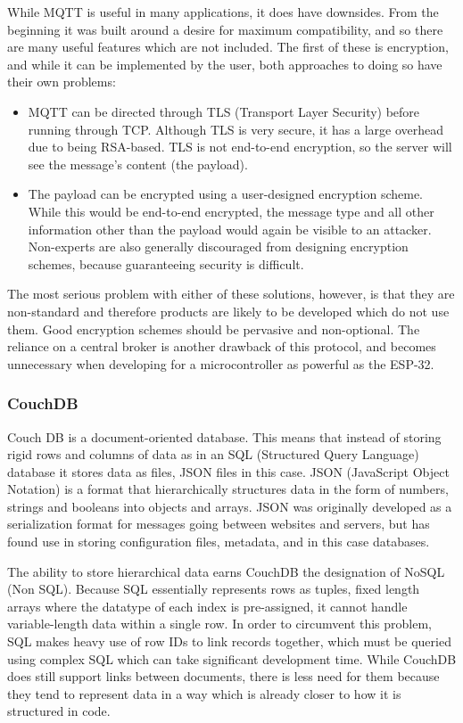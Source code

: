 \documentclass{article}
\begin{document}
While MQTT is useful in many applications, it does have downsides. From the beginning it was built around a desire for maximum compatibility, and so there are many useful features which are not included. The first of these is encryption, and while it can be implemented by the user, both approaches to doing so have their own problems:
\begin{itemize}
\item MQTT can be directed through TLS (Transport Layer Security) before running through TCP. Although TLS is very secure, it has a large overhead due to being RSA-based. TLS is not end-to-end encryption, so the server will see the message's content (the payload).
\item The payload can be encrypted using a user-designed encryption scheme. While this would be end-to-end encrypted, the message type and all other information other than the payload would again be visible to an attacker. Non-experts are also generally discouraged from designing encryption schemes, because guaranteeing security is difficult.
\end{itemize}

The most serious problem with either of these solutions, however, is that they are non-standard and therefore products are likely to be developed which do not use them. Good encryption schemes should be pervasive and non-optional. The reliance on a central broker is another drawback of this protocol, and becomes unnecessary when developing for a microcontroller as powerful as the ESP-32.

\subsubsection{CouchDB}

Couch DB is a document-oriented database. This means that instead of storing rigid rows and columns of data as in an SQL (Structured Query Language) database it stores data as files, JSON files in this case. JSON (JavaScript Object Notation) is a format that hierarchically structures data in the form of numbers, strings and booleans into objects and arrays. JSON was originally developed as a serialization format for messages going between websites and servers, but has found use in storing configuration files, metadata, and in this case databases.

The ability to store hierarchical data earns CouchDB the designation of NoSQL (Non SQL). Because SQL essentially represents rows as tuples, fixed length arrays where the datatype of each index is pre-assigned, it cannot handle variable-length data within a single row. In order to circumvent this problem, SQL makes heavy use of row IDs to link records together, which must be queried using complex SQL which can take significant development time. While CouchDB does still support links between documents, there is less need for them because they tend to represent data in a way which is already closer to how it is structured in code.
\end{document}

